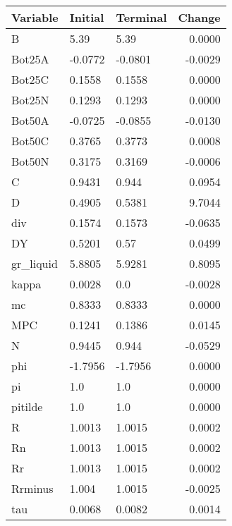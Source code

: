 \begin{table}
\centering
\label{tab:stst_comparison_end_L_wedge_permanent_asymmetric}
\begin{tabular}{lllr}
\toprule
                Variable & Initial & Terminal &  Change \\
\midrule
                       B &    5.39 &     5.39 &  0.0000 \\
                  Bot25A & -0.0772 &  -0.0801 & -0.0029 \\
                  Bot25C &  0.1558 &   0.1558 &  0.0000 \\
                  Bot25N &  0.1293 &   0.1293 &  0.0000 \\
                  Bot50A & -0.0725 &  -0.0855 & -0.0130 \\
                  Bot50C &  0.3765 &   0.3773 &  0.0008 \\
                  Bot50N &  0.3175 &   0.3169 & -0.0006 \\
                       C &  0.9431 &    0.944 &  0.0954 \\
                       D &  0.4905 &   0.5381 &  9.7044 \\
                     div &  0.1574 &   0.1573 & -0.0635 \\
                      DY &  0.5201 &     0.57 &  0.0499 \\
               gr\_liquid &  5.8805 &   5.9281 &  0.8095 \\
                   kappa &  0.0028 &      0.0 & -0.0028 \\
                      mc &  0.8333 &   0.8333 &  0.0000 \\
                     MPC &  0.1241 &   0.1386 &  0.0145 \\
                       N &  0.9445 &    0.944 & -0.0529 \\
                     phi & -1.7956 &  -1.7956 &  0.0000 \\
                      pi &     1.0 &      1.0 &  0.0000 \\
                 pitilde &     1.0 &      1.0 &  0.0000 \\
                       R &  1.0013 &   1.0015 &  0.0002 \\
                      Rn &  1.0013 &   1.0015 &  0.0002 \\
                      Rr &  1.0013 &   1.0015 &  0.0002 \\
                 Rrminus &   1.004 &   1.0015 & -0.0025 \\
                     tau &  0.0068 &   0.0082 &  0.0014 \\

\end{tabular}
\end{table}
